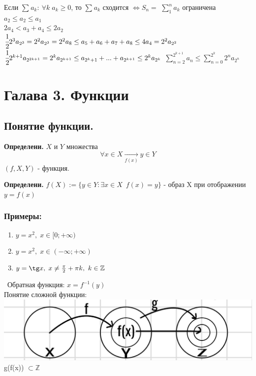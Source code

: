 \documentclass[12pt, paper]{article}
\newcommand{\Z}{\mathbb{Z}}
\begin{document}
\begin{tcolorbox}
    Если $ \sum^{}_{} a_k:\ \forall k\; a_k \geq 0$, то $ \sum^{}_{} a_k$ сходится $\Leftrightarrow S_n=$ $ \sum^{n}_{1} a_k$ ограничена\\
    $ a_2 \leq a_2 \leq a_1 $\\
    $2a_4 < a_3 + a_4 \leq 2a_2 $\\
    $\cfrac{1}{2} 2^3 a_{2^3} = 2^2a_{2^3} = 2^2a_8 \leq a_5+a_6+a_7+a_8 \leq 4a_4 = 2^2 a_{2^2}$\\
    $\cfrac{1}{2}2^{k+1} a_{2^{2k+1}} = 2^ka_{2^{k+1}} \leq a_{2^k+1} + ... + a_{2^{k+1}} \leq 2^ka_{2^k}$
    $\sum^{2^{k+1}}_{n=2} a_n \leq \sum^{2^{k}}_{n=0} 2^n a_{2^n}$
\end{tcolorbox}

\section{Галава 3. Функции}
\subsection{Понятие функции.}

\begin{tcolorbox}
	\textbf{Определени.} $X$ и $Y$ множества\\
	\[ \forall x \in X \xrightarrow[f(x)]{} y \in Y \]
	$(f, X, Y) $ - функция.
\end{tcolorbox}

\begin{tcolorbox}
	\textbf{Определени.} $f(X) := \{ y \in Y: \exists x \in X\;\ f(x) = y \}$ - образ X при отображении $y = f(x)$
\end{tcolorbox}
\subsubsection*{Примеры:}
\begin{enumerate}
	\item  $y = x^2,\; x \in [0; +\infty)$
	\item $y = x^2,\; x \in (-\infty; +\infty)$
	\item $y = \tg x,\; x \not= \frac{\pi}{2} + \pi k,\ k \in \Z$
\end{enumerate}
\
Обратная функция: $x = f^{-1}(y)$\\
Понятие сложной функции:\\
\includegraphics[width=0.5\linewidth]{images/Функции/Понятие функции/Сложная функция.jpg}\\
g(f(x)) $\subset \Z$
\end{document}
